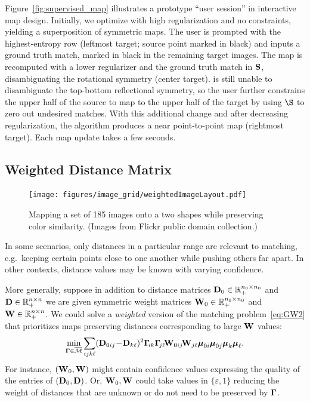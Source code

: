 Figure~\ref{fig:supervised_map} illustrates a prototype ``user session'' in interactive map design.  Initially, we optimize with high regularization and no constraints, yielding a superposition of symmetric maps.  The user is prompted with the highest-entropy row (leftmost target; source point marked in black) and inputs a ground truth match, marked in black in the remaining target images.  The map is recomputed with a lower regularizer and the ground truth match in $\mathbf S$, disambiguating the rotational symmetry (center target).  \GWa is still unable to disambiguate the top-bottom reflectional symmetry, so the user further constrains the upper half of the source to map to the upper half of the target by using $\S$ to zero out undesired matches.  With this additional change and after decreasing regularization, the algorithm produces a near point-to-point map (rightmost target).  Each map update takes a few seconds.

\subsection{Weighted Distance Matrix}\label{sec:weighted_mtx}

\begin{figure}[t]\centering
\texttt{[image: figures/image\_grid/weightedImageLayout.pdf]}
\caption{Mapping a set of 185 images onto a two shapes while preserving color similarity. \small{(Images from Flickr public domain collection.)}\vspace{-.15in}}\label{fig:weighted_images}
\end{figure}

In some scenarios, only distances in a particular range are relevant to matching, e.g.\ keeping certain points close to one another while pushing others far apart.  In other contexts, distance values may be known with varying confidence.

More generally, suppose in addition to distance matrices $\mathbf D_0\in\mathbb{R}_+^{n_0\times n_0}$ and $\mathbf D\in\mathbb{R}_+^{n\times n}$ we are given symmetric weight matrices $\mathbf W_0\in\mathbb{R}_+^{n_0\times n_0}$ and $\mathbf W\in\mathbb{R}_+^{n\times n}$.  We could solve a \emph{weighted} version of the \GWa matching problem~\eqref{eq:GW2} that prioritizes maps preserving distances corresponding to large $\mathbf W$ values:
\begin{equation}\label{eq:weighted_gw}
\min_{\mathbf \Gamma\in\overline{\mathcal M}} \sum_{ijk\ell} (\mathbf D_{0ij}\!-\!\mathbf D_{k\ell})^2\mathbf \Gamma\!_{ik}\mathbf \Gamma\!_{j\ell}\!\mathbf W_{0ij}\!\mathbf W_{j\ell}\boldsymbol{\mu}_{0i}\boldsymbol{\mu}_{0j}\boldsymbol{\mu}_k\boldsymbol{\mu}_\ell.
\end{equation}
For instance, $(\mathbf W_0,\mathbf W)$ might contain confidence values expressing the quality of the entries of $(\mathbf D_0,\mathbf D)$.  Or, $\mathbf W_0,\mathbf W$ could take values in $\{\varepsilon,1\}$ reducing the weight of distances that are unknown or do not need to be preserved by $\mathbf \Gamma$.

